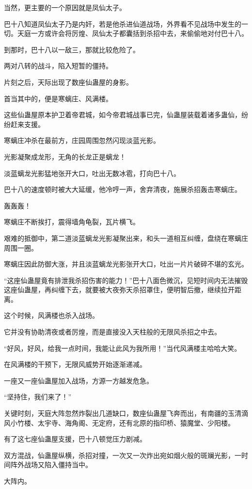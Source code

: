 \begin{this_body}
当然，更主要的一个原因就是凤仙太子。

巴十八知道凤仙太子乃是内奸，若是他杀进仙道战场，外界看不见战场中发生的一切。天庭一方或许会将厉煌、凤仙太子都囊括到杀招中去，来偷偷地对付巴十八。

到那时，巴十八以一敌三，那就比较危险了。

两对八转的战斗，陷入短暂的僵持。

片刻之后，天际出现了数座仙蛊屋的身影。

首当其中的，便是寒螭庄、风满楼。

这些仙蛊屋原本护卫着帝君城，如今帝君城战事已完，仙蛊屋装载着诸多蛊仙，纷纷赶来支援。

寒螭庄冲杀在最前方，庄园周围忽然闪现淡蓝光影。

光影凝聚成龙形，无角的长龙正是螭龙！

淡蓝螭龙光影猛地张开大口，吐出无数冰雹，打向巴十八。

巴十八的速度顿时被大大延缓，他冷哼一声，舍弃清夜，施展杀招轰击寒螭庄。

轰轰轰！

寒螭庄不断挨打，震得墙角龟裂，瓦片横飞。

艰难的抵御中，第二道淡蓝螭龙光影凝聚出来，和头一道相互纠缠，盘绕在寒螭庄周围一圈。

寒螭庄因此防御大涨，并且淡蓝螭龙光影张开大口，吐出一片片破碎不堪的玄光。

“这座仙蛊屋竟有排泄我杀招伤害的能力！”巴十八面色微沉，见短时间内无法摧毁这座仙蛊屋，再纠缠下去，就要被大夜弥天杀招罩住，便明智后撤，继续拉开距离。

这个时候，风满楼也杀入战场。

它并没有协助清夜或者厉煌，而是直接没入天柱般的无限风杀招之中去。

“好风，好风，给我一点时间，我能让此风为我所用！”当代风满楼主哈哈大笑。

在风满楼的干预下，无限风威势开始逐渐递减。

一座又一座仙蛊屋加入战场，方源一方越发危急。

“坚持住，我们来了！”

关键时刻，天庭大阵忽然炸裂出几道缺口，数座仙蛊屋飞奔而出，有南疆的玉清滴风小竹楼、太宇寺、海角阁、无定府，还有北原的指印桥、猿魔堂、少阳楼。

有了这七座仙蛊屋支援，巴十八顿觉压力剧减。

双方混战，仙蛊屋纵横，杀招对撞，一次又一次炸出宛如烟火般的斑斓光影，一时间阵外战场又陷入僵持当中。

大阵内。


\end{this_body}
